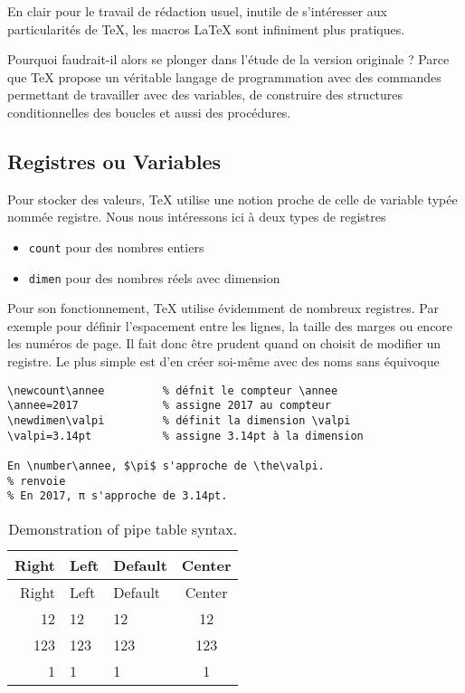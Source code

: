 En clair pour le travail de rédaction usuel, inutile de s'intéresser aux
particularités de TeX, les macros LaTeX sont infiniment plus pratiques.

Pourquoi faudrait-il alors se plonger dans l'étude de la version
originale ? Parce que TeX propose un véritable langage de programmation
avec des commandes permettant de travailler avec des variables, de
construire des structures conditionnelles des boucles et aussi des
procédures.

\subsection{Registres ou Variables}\label{registres-ou-variables}

Pour stocker des valeurs, TeX utilise une notion proche de celle de
variable typée nommée registre. Nous nous intéressons ici à deux types
de registres

\begin{itemize}
\tightlist
\item
  \texttt{count} pour des nombres entiers
\item
  \texttt{dimen} pour des nombres réels avec dimension
\end{itemize}

Pour son fonctionnement, TeX utilise évidemment de nombreux registres.
Par exemple pour définir l'espacement entre les lignes, la taille des
marges ou encore les numéros de page. Il fait donc être prudent quand on
choisit de modifier un registre. Le plus simple est d'en créer soi-même
avec des noms sans équivoque

\begin{verbatim}
\newcount\annee         % défnit le compteur \annee
\annee=2017             % assigne 2017 au compteur
\newdimen\valpi         % définit la dimension \valpi
\valpi=3.14pt           % assigne 3.14pt à la dimension

En \number\annee, $\pi$ s'approche de \the\valpi.
% renvoie
% En 2017, π s'approche de 3.14pt.
\end{verbatim}

\begin{longtable}[c]{@{}rllc@{}}
\caption{Demonstration of pipe table syntax.}\tabularnewline
\toprule
Right & Left & Default & Center\tabularnewline
\midrule
\endfirsthead
\toprule
Right & Left & Default & Center\tabularnewline
\midrule
\endhead
12 & 12 & 12 & 12\tabularnewline
123 & 123 & 123 & 123\tabularnewline
1 & 1 & 1 & 1\tabularnewline
\bottomrule
\end{longtable}
